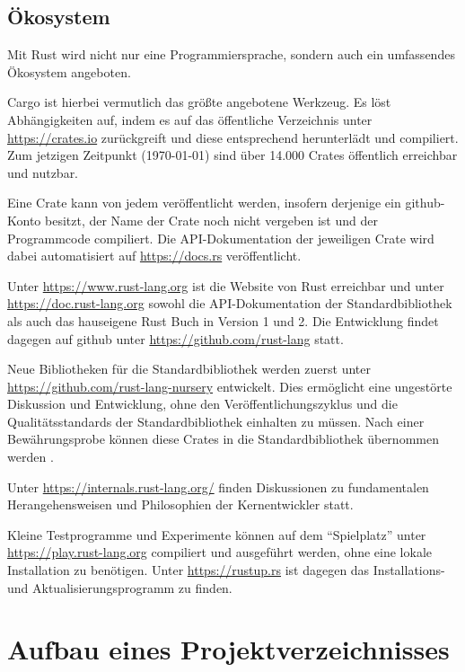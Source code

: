 \subsection{Ökosystem}

Mit Rust wird nicht nur eine Programmiersprache, sondern auch ein umfassendes Ökosystem angeboten.

Cargo ist hierbei vermutlich das größte angebotene Werkzeug.
Es löst Abhängigkeiten auf, indem es auf das öffentliche Verzeichnis unter \url{https://crates.io} zurückgreift und diese entsprechend herunterlädt und compiliert.
Zum jetzigen Zeitpunkt (\today) sind über 14.000 Crates öffentlich erreichbar und nutzbar.

Eine Crate kann von jedem veröffentlicht werden, insofern derjenige ein \gls{github}-Konto besitzt, der Name der Crate noch nicht vergeben ist und der Programmcode compiliert.
Die API-Dokumentation der jeweiligen Crate wird dabei automatisiert auf \url{https://docs.rs} veröffentlicht.

Unter \url{https://www.rust-lang.org} ist die Website von Rust erreichbar und unter \url{https://doc.rust-lang.org} sowohl die API-Dokumentation der Standardbibliothek als auch das hauseigene Rust Buch in Version 1 und 2.
Die Entwicklung findet dagegen auf \gls{github} unter \url{https://github.com/rust-lang} statt.

Neue Bibliotheken für die Standardbibliothek werden zuerst unter \url{https://github.com/rust-lang-nursery} entwickelt.
Dies ermöglicht eine ungestörte Diskussion und Entwicklung, ohne den Veröffentlichungszyklus und die Qualitätsstandards der Standardbibliothek einhalten zu müssen.
Nach einer Bewährungsprobe können diese Crates in die Standardbibliothek übernommen werden \cite{rust:internals:1242_Recap}.

Unter \url{https://internals.rust-lang.org/} finden Diskussionen zu fundamentalen Herangehensweisen und Philosophien der Kernentwickler statt.

Kleine Testprogramme und Experimente können auf dem \enquote{Spielplatz} unter \url{https://play.rust-lang.org} compiliert und ausgeführt werden, ohne eine lokale Installation zu benötigen.
Unter \url{https://rustup.rs} ist dagegen das Installations- und Aktualisierungsprogramm  zu finden.

\section{Aufbau eines Projektverzeichnisses}

